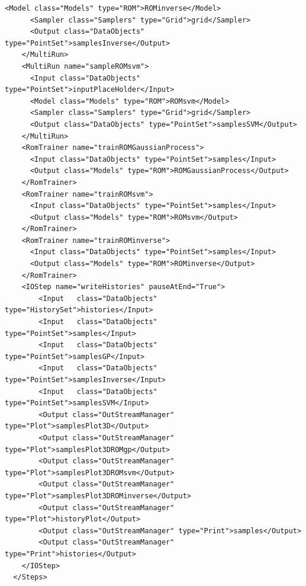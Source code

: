 \begin{enumerate}
\begin{lstlisting}[style=XML,morekeywords={arg,extension,pauseAtEnd,overwrite}]
      <Model class="Models" type="ROM">ROMinverse</Model>
      <Sampler class="Samplers" type="Grid">grid</Sampler>
      <Output class="DataObjects" type="PointSet">samplesInverse</Output>
    </MultiRun>
    <MultiRun name="sampleROMsvm">
      <Input class="DataObjects" type="PointSet">inputPlaceHolder</Input>
      <Model class="Models" type="ROM">ROMsvm</Model>
      <Sampler class="Samplers" type="Grid">grid</Sampler>
      <Output class="DataObjects" type="PointSet">samplesSVM</Output>
    </MultiRun>
    <RomTrainer name="trainROMGaussianProcess">
      <Input class="DataObjects" type="PointSet">samples</Input>
      <Output class="Models" type="ROM">ROMGaussianProcess</Output>
    </RomTrainer>
    <RomTrainer name="trainROMsvm">
      <Input class="DataObjects" type="PointSet">samples</Input>
      <Output class="Models" type="ROM">ROMsvm</Output>
    </RomTrainer>
    <RomTrainer name="trainROMinverse">
      <Input class="DataObjects" type="PointSet">samples</Input>
      <Output class="Models" type="ROM">ROMinverse</Output>
    </RomTrainer>
    <IOStep name="writeHistories" pauseAtEnd="True">
        <Input   class="DataObjects"      type="HistorySet">histories</Input>
        <Input   class="DataObjects"      type="PointSet">samples</Input>
        <Input   class="DataObjects"      type="PointSet">samplesGP</Input>
        <Input   class="DataObjects"      type="PointSet">samplesInverse</Input>
        <Input   class="DataObjects"      type="PointSet">samplesSVM</Input>
        <Output class="OutStreamManager" type="Plot">samplesPlot3D</Output>
        <Output class="OutStreamManager" type="Plot">samplesPlot3DROMgp</Output>
        <Output class="OutStreamManager" type="Plot">samplesPlot3DROMsvm</Output>
        <Output class="OutStreamManager" type="Plot">samplesPlot3DROMinverse</Output>
        <Output class="OutStreamManager" type="Plot">historyPlot</Output>
        <Output class="OutStreamManager" type="Print">samples</Output>
        <Output class="OutStreamManager" type="Print">histories</Output>
    </IOStep>
  </Steps>
\end{lstlisting}
 \begin{figure}[h!]
  \centering

\end{figure}
\end{enumerate}
